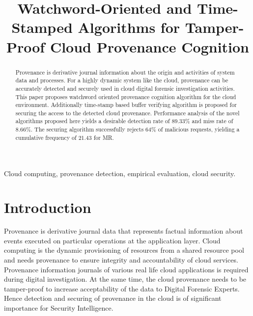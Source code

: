 \documentclass[conference]{IEEEtran}
\begin{document}
\title{ Watchword-Oriented and Time-Stamped Algorithms for Tamper-Proof Cloud Provenance Cognition}



\author{
}



\maketitle


\begin{abstract}
Provenance is derivative journal information about the origin and activities of system data and processes. For a highly dynamic system like the cloud, provenance can be accurately detected and securely used in cloud digital forensic investigation activities. This paper proposes watchword oriented provenance cognition algorithm for the cloud environment. Additionally time-stamp based buffer verifying algorithm is proposed for securing the access to the detected cloud provenance. Performance analysis of the novel algorithms proposed here yields a desirable detection rate of 89.33\% and miss rate of 8.66\%. The securing algorithm successfully rejects 64\% of malicious requests, yielding a cumulative frequency of 21.43 for MR.
\end{abstract}

\begin{IEEEkeywords}
Cloud computing, provenance detection, empirical evaluation, cloud security.
\end{IEEEkeywords}



\IEEEpeerreviewmaketitle



\section{Introduction}

Provenance is derivative journal data that represents factual information about events executed on particular operations at the application layer. Cloud computing is the dynamic provisioning of resources from a shared resource pool and needs provenance to ensure integrity and accountability of cloud services. Provenance information journals of various real life cloud applications is required during digital investigation. At the same time, the cloud provenance needs to be tamper-proof to increase acceptability of the data to Digital Forensic Experts. Hence detection and securing of provenance in the cloud is of significant importance for Security Intelligence.
\end{document}
